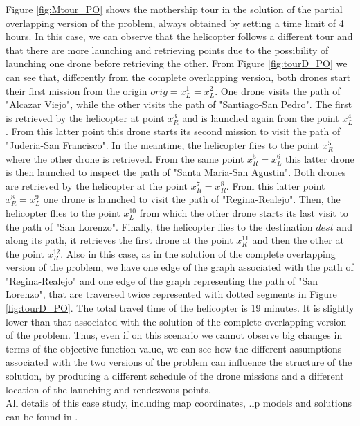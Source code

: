 \documentclass[10pt,a4paper]{elsarticle}
\newcommand{\EN}[1]{{\color{black}#1}}
\begin{document}
Figure \ref{fig:Mtour_PO} shows the mothership tour in the solution of the partial overlapping version of the problem, always obtained by setting a time limit of 4 hours. In this case, we can observe that the helicopter follows a different tour and that there are more launching and retrieving points due to the possibility of launching \EN{one} drone before retrieving the other. From Figure \ref{fig:tourD_PO} we can see that, differently from the complete overlapping version, both drones start their first mission from the origin $orig=x_L^1=x_L^2$. One drone visits the path of "Alcazar Viejo", while the other visits the path of "Santiago-San Pedro". The first is retrieved by the helicopter at point $x_R^3$ and is launched again from the point $x_L^4$. From this latter point this drone starts its second mission to visit the path of "Juderia-San Francisco". In the meantime, the helicopter flies to the point $x_R^5$ where the other drone is retrieved. From the same point $x_R^5=x_L^6$ this latter drone is then launched to inspect the path of "Santa Maria-San Agustin". Both drones are retrieved by the helicopter at the point $x_R^7=x_R^8$. From this latter point $x_R^8=x_L^9$ one drone is launched to visit the path of "Regina-Realejo". Then, the helicopter flies to the point $x_L^{10}$ from \EN{which} the other drone starts its last visit to the path of "San Lorenzo". Finally, the helicopter flies to the destination $dest$ and along its path, it retrieves the first drone at the point $x_R^{11}$ and then the other at the point $x_R^{12}$. Also in this case, \EN{as} in the solution of the complete overlapping version of the problem, we have one edge of the graph associated with the path of "Regina-Realejo" and one edge of the graph representing the path of "San Lorenzo", that are traversed twice represented with dotted segments in Figure \ref{fig:tourD_PO}. The total travel time of the helicopter is 19 minutes. It is slightly lower than \EN{that} associated with the solution of the complete overlapping version of the problem. Thus, even if on this scenario we cannot observe big changes in terms of the objective function value, we can see how the different assumptions associated with the two versions of the problem can influence the structure of the solution, by producing a different schedule of the drone missions and a different location of the launching and rendezvous points.\\
\noindent
All details of this case study, including map coordinates, .lp models and solutions can be found in \cite{Puerto2021}.
\end{document}
